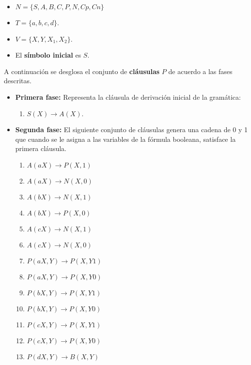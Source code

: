 \begin{itemize}
    \item $N=\{S,A,B,C,P,N,Cp,Cn\}$
    \item $T=\{a,b,c,d\}$.
    \item $V=\{X,Y,X_1,X_2\}$.
    \item El \textbf{símbolo inicial} es $S$.
\end{itemize}

A continuación se desglosa el conjunto de \textbf{cláusulas} $P$ de acuerdo a las fases descritas.

\begin{itemize}
    \item \textbf{Primera fase:} Representa la cláusula de derivación inicial de la gramática:
          \begin{enumerate}
              \item $S(X)\to A(X)$.
          \end{enumerate}
          
    \item \textbf{Segunda fase:} El siguiente conjunto de cláusulas genera una cadena de 0 y 1 que cuando se le asigna a las variables de la fórmula booleana, satisface la primera cláusula.
          \begin{multicols}{2}
              \begin{enumerate}[start=2]
                  \item $A(aX)\to P(X,1)$
                  \item $A(aX)\to N(X,0)$
                  \item $A(bX)\to N(X,1)$
                  \item $A(bX)\to P(X,0)$
                  \item $A(cX)\to N(X,1)$
                  \item $A(cX)\to N(X,0)$
                        
                  \item $P(aX,Y)\to P(X,Y1)$
                  \item $P(aX,Y)\to P(X,Y0)$
                  \item $P(bX,Y)\to P(X,Y1)$
                  \item $P(bX,Y)\to P(X,Y0)$
                  \item $P(cX,Y)\to P(X,Y1)$
                  \item $P(cX,Y)\to P(X,Y0)$
                  \item $P(dX,Y)\to B(X,Y)$
                        

\end{enumerate}
\end{multicols}
\end{itemize}
